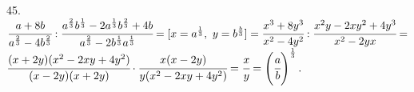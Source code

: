 45. $\cfrac{a+8b}{a^\frac{2}{3}-4b^\frac{2}{3}}:\cfrac{a^\frac{2}{3}b^\frac{1}{3}-2a^\frac{1}{3}b^\frac{2}{3}+4b}{a^\frac{2}{3}-2b^\frac{1}{3}a^\frac{1}{3}}=
[x=a^\frac{1}{3},\ y=b^\frac{b}{3}]=\cfrac{x^3+8y^3}{x^2-4y^2}:\cfrac{x^2y-2xy^2+4y^3}{x^2-2yx}=$\\$
\cfrac{(x+2y)(x^2-2xy+4y^2)}{(x-2y)(x+2y)}\cdot\cfrac{x(x-2y)}{y(x^2-2xy+4y^2)}=\cfrac{x}{y}=\left(\cfrac{a}{b}\right)^\frac{1}{3}.$\\
